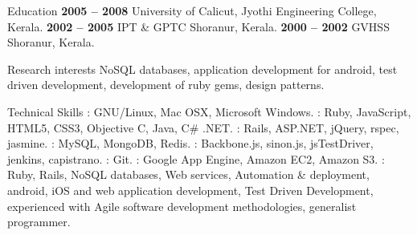 \documentclass{resume}
\author{Abhilash M A}
\begin{document}
\maketitle


\begin{category}{Education}
   \hfill \textbf{2005 -- 2008}
  \citemnobullet University of Calicut, Jyothi Engineering College, Kerala.
   \hfill \textbf{2002 -- 2005}
  \citemnobullet IPT \& GPTC Shoranur, Kerala.
   \hfill \textbf{2000 -- 2002}
  \citemnobullet GVHSS Shoranur, Kerala.
\end{category}


\begin{category}{Research interests}
  \citemnobullet NoSQL databases, application development for android,
  test driven development, development of ruby gems, design patterns.
\end{category}

\begin{category}{Technical Skills}
  : GNU/Linux, Mac OSX, Microsoft Windows.
  : Ruby, JavaScript, HTML5, CSS3,
  Objective C, Java, C\# .NET.
  : Rails, ASP.NET, jQuery, rspec, jasmine.
  : MySQL, MongoDB, Redis.
  : Backbone.js, sinon.js, jsTestDriver,
  jenkins, capistrano.
  : Git.
  : Google App Engine, Amazon EC2, Amazon S3.
  : Ruby, Rails, NoSQL databases, Web services, Automation \& deployment, 
  android, iOS and web application development, Test Driven
  Development, experienced with Agile software development
  methodologies, generalist programmer.
\end{category}

\end{document}
